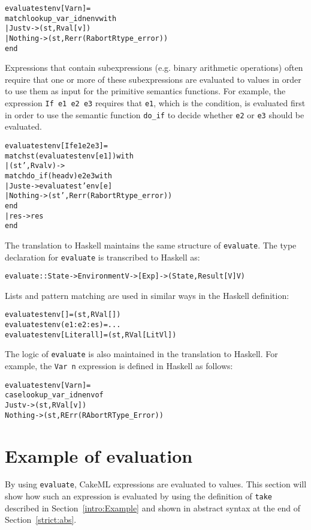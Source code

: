 \begin{alltt}
  evaluate st env [Var n] =
    match lookup_var_id n env with
    | Just v -> (st, Rval [v])
    | Nothing -> (st, Rerr (Rabort Rtype_error))
    end
\end{alltt}

\noindent Expressions that contain subexpressions (e.g. binary arithmetic
operations) often require that one or more of these subexpressions are
evaluated to values in order to use them as input for the primitive semantics
functions. For example, the expression \texttt{If e1 e2 e3} requires that
\texttt{e1}, which is the condition, is evaluated first in order to use the
semantic function \texttt{do\_if} to decide whether \texttt{e2} or
\texttt{e3} should be evaluated.

\begin{alltt}
  evaluate st env [If e1 e2 e3] =
    match st (evaluate st env [e1]) with
    | (st', Rval v) ->
        match do_if (head v) e2 e3 with
        | Just e -> evaluate st' env [e]
        | Nothing -> (st', Rerr (Rabort Rtype_error))
        end
    | res -> res
    end
\end{alltt}

The translation to Haskell maintains the same structure of \texttt{evaluate}.
The type declaration for \texttt{evaluate} is transcribed to Haskell as:
\begin{alltt}
  evaluate :: State -> Environment V -> [Exp] -> (State, Result [V] V)
\end{alltt}

\noindent Lists and pattern matching are used in similar ways in the Haskell definition:

\begin{alltt}
  evaluate st env []          = (st, RVal [])
  evaluate st env (e1:e2:es)  = ...
  evaluate st env [Literal l] = (st, RVal [LitV l])
\end{alltt}

\noindent The logic of \texttt{evaluate} is also maintained in the translation
to Haskell. For example, the \texttt{Var n} expression is defined in Haskell as
follows:
\newpage
\begin{alltt}
  evaluate st env [Var n] =
    case lookup_var_id n env of
      Just v  -> (st, RVal [v])
      Nothing -> (st, RErr (RAbort RType_Error))
\end{alltt}

\section{Example of evaluation}
\label{strict:example}
By using \texttt{evaluate}, CakeML expressions are evaluated to values. This
section will show how such an expression is evaluated by using the definition of
\texttt{take} described in Section~\ref{intro:Example} and shown in abstract
syntax at the end of Section~\ref{strict:abs}.

